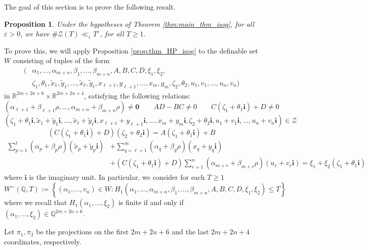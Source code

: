 \documentclass[11pt,a4paper,reqno]{amsart}
\numberwithin{equation}{section}
\newcommand{\Q}{\mathbb{Q}}
\newcommand{\R}{\mathbb{R}}
\renewcommand{\a}{\alpha}
\renewcommand{\b}{\beta}
\newcommand{\eps}{\varepsilon}
\renewcommand{\r}{\rho}
\renewcommand{\i}{\mathbf{i}}
\newcommand{\pt}[1]{\left( #1 \right)}
\newcommand{\pg}[1]{\left\lbrace #1 \right\rbrace}
\newtheorem{proposition}[theorem]{Proposition}
\theoremstyle{remark}
\theoremstyle{definition}
\theoremstyle{definition}
\begin{document}
The goal of this section is to prove the following result.
\begin{proposition}\label{prop:main_estim_isog}
Under the hypotheses of Theorem \ref{thm:main_thm_isog}, for all $\eps>0$, we have $\# \mathcal{Z}(T)\ll_{\eps} T^{\eps}$, for all $T\geq 1$.
\end{proposition}
To prove this, we will apply Proposition \ref{prop:thm_HP_isog} to the definable set $W$ consisting of tuples of the form
\begin{align*}
(&\a_{1}, \ldots, \a_{m+n},\b_{1}, \ldots, \b_{m+n}, A,B,C,D, \xi_1, \xi_2,\\
 &\zeta_1, \theta_1, \widetilde{x}_1, \widetilde{y}_1, \ldots,\widetilde{x}_{\ell}, \widetilde{y}_{\ell}, x_{\ell+1}, y_{\ell+1}, \ldots, x_m, y_m,\zeta_2, \theta_2, u_1, v_1, \ldots, u_n, v_n)
\end{align*}
in $\R^{2m+2n+6} \times \R^{2m+2n+4}$, satisfying the following relations:
$$\pt{\a_{\ell+1}+\b_{\ell+1} \r, \ldots,\a_{m+n}+ \b_{m+n} \r}\neq \mathbf{0} \qquad AD - BC \neq 0  \qquad C(\zeta_1 + \theta_1 \i) + D \neq 0$$
$$\pt{\zeta_1+\theta_1 \i,\widetilde{x}_1+\widetilde{y}_1 \i,\ldots, \widetilde{x}_{\ell}+\widetilde{y}_{\ell} \i, x_{\ell+1}+y_{\ell+1} \i, \ldots, x_m+y_m \i, \zeta_2+\theta_2 \i, u_1+v_1 \i, \ldots, u_n+v_n \i} \in \mathcal{Z}$$\vspace{-0.3cm}
$$\pt{C(\zeta_1+\theta_1 \i)+D}(\zeta_2+\theta_2 \i)=A(\zeta_1+\theta_1 \i)+B$$
\begin{align*}
\sum\limits_{p=1}^{\ell}(\a_p+\b_p \r)(\widetilde{x}_p+\widetilde{y}_p \i) &+ \sum\limits_{q=\ell+1}^{m}(\a_q+\b_q \r)(x_q+y_q \i)\\
&+\pt{C(\zeta_1+\theta_1 \i)+D}\sum\limits_{r=1}^{n}(\a_{m+r}+\b_{m+r}\r)(u_r+v_r \i)
=\xi_1+\xi_2(\zeta_1+\theta_1 \i)
\end{align*}
where $\i$ is the imaginary unit. In particular, we consider for each $ T\geq 1 $
\[ W^{\sim}(\Q,T):=\pg{(\a_{1}, \ldots, v_n)\in W: H_1(\a_{1}, \ldots, \a_{m+n},\b_{1}, \ldots, \b_{m+n}, A,B,C,D, \xi_1, \xi_2)\leq T} \]
where we recall that $H_1(\a_{1}, \ldots, \xi_2)$ is finite if and only if $(\a_{1}, \ldots, \xi_2) \in \Q^{2m+2n+6}$. 

Let $\pi_1, \pi_2$ be the projections on the first $2m+2n+6$ and the last $2m+2n+4$ coordinates, respectively.
\end{document}

